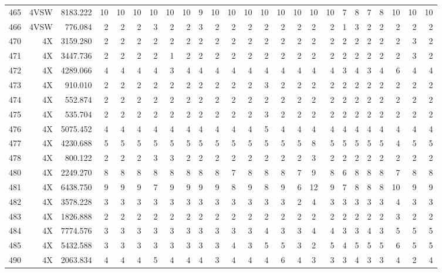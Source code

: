 \documentclass[12pt]{article}\usepackage[]{graphicx}\usepackage[]{color}
\begin{document}
\begin{landscapepage}
\begin{longtable}[t]{crrrrrrrrrrrrrrrcrrrrrrrr}
465 & 4VSW & 8183.222 & 10 & 10 & 10 & 10 & 10 & 10 & 9 & 10 & 10 & 10 & 10 & 10 & 10 & 10 & 10 & 7 & 8 & 7 & 8 & 10 & 10 & 10\\
466 & 4VSW & 776.084 & 2 & 2 & 2 & 3 & 2 & 2 & 3 & 2 & 2 & 2 & 2 & 2 & 2 & 2 & 2 & 1 & 3 & 2 & 2 & 2 & 2 & 2\\
470 & 4X & 3159.280 & 2 & 2 & 2 & 2 & 2 & 2 & 2 & 2 & 2 & 2 & 2 & 2 & 2 & 2 & 2 & 2 & 2 & 2 & 2 & 2 & 3 & 2\\
471 & 4X & 3447.736 & 2 & 2 & 2 & 2 & 1 & 2 & 2 & 2 & 2 & 2 & 2 & 2 & 2 & 2 & 2 & 2 & 2 & 2 & 2 & 2 & 3 & 2\\
472 & 4X & 4289.066 & 4 & 4 & 4 & 4 & 3 & 4 & 4 & 4 & 4 & 4 & 4 & 4 & 4 & 4 & 4 & 3 & 4 & 3 & 4 & 6 & 4 & 4\\
473 & 4X & 910.010 & 2 & 2 & 2 & 2 & 2 & 2 & 2 & 2 & 2 & 2 & 3 & 2 & 2 & 2 & 2 & 2 & 2 & 2 & 2 & 2 & 2 & 2\\
474 & 4X & 552.874 & 2 & 2 & 2 & 2 & 2 & 2 & 2 & 2 & 2 & 2 & 2 & 2 & 2 & 2 & 2 & 2 & 2 & 2 & 2 & 2 & 2 & 2\\
475 & 4X & 535.704 & 2 & 2 & 2 & 2 & 2 & 2 & 2 & 2 & 2 & 2 & 3 & 2 & 2 & 2 & 2 & 2 & 2 & 2 & 2 & 2 & 2 & 2\\
476 & 4X & 5075.452 & 4 & 4 & 4 & 4 & 4 & 4 & 4 & 4 & 4 & 4 & 5 & 4 & 4 & 4 & 4 & 4 & 4 & 4 & 4 & 4 & 4 & 4\\
477 & 4X & 4230.688 & 5 & 5 & 5 & 5 & 5 & 5 & 5 & 5 & 5 & 5 & 5 & 5 & 5 & 8 & 5 & 5 & 5 & 5 & 5 & 4 & 5 & 5\\
478 & 4X & 800.122 & 2 & 2 & 2 & 3 & 3 & 2 & 2 & 2 & 2 & 2 & 2 & 2 & 2 & 3 & 2 & 2 & 2 & 2 & 2 & 2 & 2 & 2\\
480 & 4X & 2249.270 & 8 & 8 & 8 & 8 & 8 & 8 & 8 & 8 & 7 & 8 & 8 & 8 & 7 & 9 & 8 & 6 & 8 & 8 & 8 & 7 & 8 & 8\\
481 & 4X & 6438.750 & 9 & 9 & 9 & 7 & 9 & 9 & 9 & 9 & 8 & 9 & 8 & 9 & 6 & 12 & 9 & 7 & 8 & 8 & 8 & 10 & 9 & 9\\
482 & 4X & 3578.228 & 3 & 3 & 3 & 3 & 3 & 3 & 3 & 3 & 3 & 3 & 3 & 3 & 2 & 4 & 3 & 3 & 3 & 3 & 3 & 4 & 3 & 3\\
483 & 4X & 1826.888 & 2 & 2 & 2 & 2 & 2 & 2 & 2 & 2 & 2 & 2 & 2 & 2 & 2 & 2 & 2 & 2 & 2 & 2 & 2 & 3 & 2 & 2\\
484 & 4X & 7774.576 & 3 & 3 & 3 & 3 & 3 & 3 & 3 & 3 & 3 & 3 & 4 & 3 & 3 & 4 & 4 & 3 & 3 & 4 & 3 & 5 & 5 & 5\\
485 & 4X & 5432.588 & 3 & 3 & 3 & 3 & 3 & 3 & 3 & 3 & 4 & 3 & 5 & 5 & 3 & 2 & 5 & 4 & 5 & 5 & 5 & 6 & 5 & 5\\
490 & 4X & 2063.834 & 4 & 4 & 4 & 5 & 4 & 4 & 4 & 3 & 4 & 4 & 4 & 6 & 4 & 3 & 3 & 3 & 4 & 3 & 3 & 4 & 2 & 4\\

\end{longtable}
\end{landscapepage}
\end{document}
